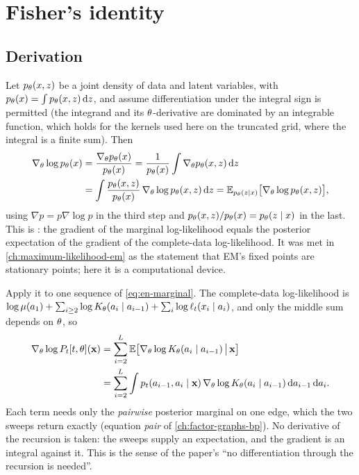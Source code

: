 \section{Fisher's identity}

\subsection{Derivation}

Let $p_\theta(x,z)$ be a joint density of data and latent variables, with
$p_\theta(x)=\int p_\theta(x,z)\,\mathrm{d} z$, and assume differentiation under the integral
sign is permitted (the integrand and its $\theta$-derivative are dominated by an
integrable function, which holds for the kernels used here on the truncated grid, where
the integral is a finite sum). Then
\begin{equation}
\begin{aligned}
  \nabla_\theta\log p_\theta(x)&=\frac{\nabla_\theta p_\theta(x)}{p_\theta(x)}
  =\frac{1}{p_\theta(x)}\int\nabla_\theta p_\theta(x,z)\,\mathrm{d} z\\
  &=\int\frac{p_\theta(x,z)}{p_\theta(x)}\,\nabla_\theta\log p_\theta(x,z)\,\mathrm{d} z
  =\mathbb{E}_{p_\theta(z\mid x)}\bigl[\nabla_\theta\log p_\theta(x,z)\bigr],
\end{aligned}
  \label{eq:en-fisher-general}
\end{equation}
using $\nabla p=p\nabla\log p$ in the third step and $p_\theta(x,z)/p_\theta(x)=p_\theta(z\mid x)$
in the last. This is : the gradient of the marginal
log-likelihood equals the posterior expectation of the gradient of the complete-data
log-likelihood. It was met in \cref{ch:maximum-likelihood-em} as the statement that
EM's fixed points are stationary points; here it is a computational device.

Apply it to one sequence of \cref{eq:en-marginal}. The complete-data log-likelihood is
$\log\mu(a_1)+\sum_{i\ge2}\log K_{\theta}(a_i\mid a_{i-1})+\sum_i\log\ell_t(x_i\mid a_i)$, and
only the middle sum depends on $\theta$, so
\begin{equation}
\begin{aligned}
  \nabla_\theta\log P_t[t,\theta](\mathbf{x})
  &=\sum_{i=2}^{L}\mathbb{E}\bigl[\nabla_\theta\log K_{\theta}(a_i\mid a_{i-1})\,\big|\,\mathbf{x}\bigr]\\
  &=\sum_{i=2}^{L}\int p_t(a_{i-1},a_i\mid\mathbf{x})\,\nabla_\theta\log K_{\theta}(a_i\mid a_{i-1})\,\mathrm{d} a_{i-1}\,\mathrm{d} a_i.
\end{aligned}
  \label{eq:en-fisher-chain}
\end{equation}
Each term needs only the \emph{pairwise} posterior marginal on one edge, which the
two sweeps return exactly (equation \emph{pair} of \cref{ch:factor-graphs-bp}). No
derivative of the recursion is taken: the sweeps supply an expectation, and the
gradient is an integral against it. This is the sense of the paper's ``no
differentiation through the recursion is needed''.

